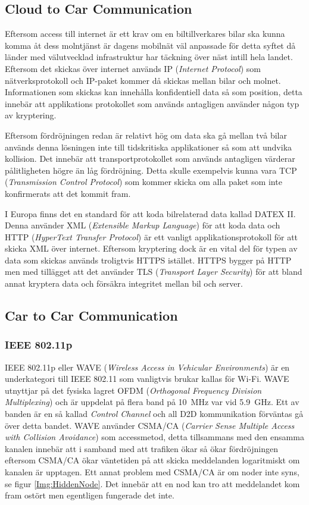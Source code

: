 \documentclass[a4paper]{IEEEtran}
\begin{document}
\subsection{Cloud to Car Communication}
Eftersom access till internet är ett krav om en biltillverkares bilar ska kunna komma åt dess molntjänst är dagens mobilnät väl anpassade för detta syftet då länder med välutvecklad infrastruktur har täckning över näst intill hela landet. 
Eftersom det skickas över internet används IP (\emph{Internet Protocol}) som nätverksprotokoll och IP-paket kommer då skickas mellan bilar och molnet. 
Informationen som skickas kan innehålla konfidentiell data så som position, detta innebär att applikations protokollet som används antagligen använder någon typ av kryptering.

Eftersom fördröjningen redan är relativt hög om data ska gå mellan två bilar används denna lösningen inte till tidskritiska applikationer så som att undvika kollision. 
Det innebär att transportprotokollet som används antagligen värderar pålitligheten högre än låg fördröjning. 
Detta skulle exempelvis kunna vara TCP (\emph{Transmission Control Protocol}) som kommer skicka om alla paket som inte konfirmerats att det kommit fram. \cite{TCP}

I Europa finns det en standard för att koda bilrelaterad data kallad DATEX \textrm{II}. 
Denna använder XML (\emph{Extensible Markup Language}) för att koda data och HTTP (\emph{HyperText Transfer Protocol}) är ett vanligt applikationsprotokoll för att skicka XML över  internet.
Eftersom kryptering dock är en vital del för typen av data som skickas används troligtvis HTTPS istället. 
HTTPS bygger på HTTP men med tillägget att det använder TLS (\emph{Transport Layer Security}) för att bland annat kryptera data och försäkra integritet mellan bil och server. \cite{DATEXII,HTTPS,TLS}

\subsection{Car to Car Communication}
\subsubsection{IEEE 802.11p}
IEEE 802.11p eller WAVE (\emph{Wireless Access in Vehicular Environments}) är en underkategori till IEEE 802.11 som vanligtvis brukar kallas för Wi-Fi. 
WAVE utnyttjar på det fysiska lagret OFDM (\emph{Orthogonal Frequency Division Multiplexing}) och är uppdelat på flera band på 10~MHz var vid 5.9~GHz. 
Ett av banden är en så kallad \emph{Control Channel} och all D2D kommunikation förväntas gå över detta bandet. 
WAVE använder CSMA/CA (\emph{Carrier Sense Multiple Access with Collision Avoidance}) som accessmetod, detta tillsammans med den ensamma kanalen innebär att i samband med att trafiken ökar så ökar fördröjningen eftersom CSMA/CA ökar väntetiden på att skicka meddelanden logaritmiskt om kanalen är upptagen.
Ett annat problem med CSMA/CA är om noder inte syns, se figur \ref{Img:HiddenNode}. %
Det innebär att en nod kan tro att meddelandet kom fram ostört men egentligen fungerade det inte.
\end{document}
